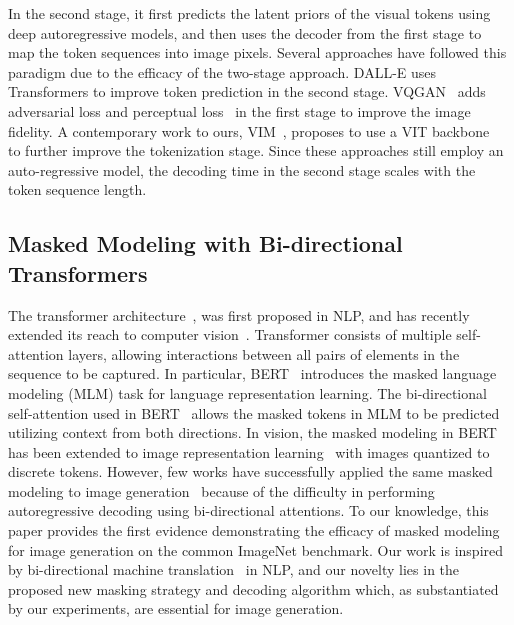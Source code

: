 \noindent In the second stage, it first predicts the latent priors of the visual tokens using deep autoregressive models, and then uses the decoder from the first stage to map the token sequences into image pixels. Several approaches have followed this paradigm due to the efficacy of the two-stage approach. DALL-E \cite{Ramesh21dalle} uses Transformers \cite{Vaswani17attention} to improve token prediction in the second stage. VQGAN~\cite{Esser21vqgan} adds adversarial loss and perceptual loss~\cite{johnson2016perceptual, zhang2018unreasonable} in the first stage to improve the image fidelity. A contemporary work to ours, VIM~\cite{vim2021}, proposes to use a VIT backbone ~\cite{dosovitskiy2021vit} to further improve the tokenization stage. Since these approaches still employ an auto-regressive model, the decoding time in the second stage scales with the token sequence length. 

\subsection{Masked Modeling with Bi-directional Transformers}
The transformer architecture~\cite{Vaswani17attention}, was first proposed in NLP, and has recently extended its reach to computer vision~\cite{dosovitskiy2021vit, caron2021dino}.
Transformer consists of multiple self-attention layers, allowing interactions between all pairs of elements in the sequence to be captured.
In particular, BERT~\cite{Devlin19bert} introduces the masked language modeling (MLM) task for language representation learning. The bi-directional self-attention used in BERT~\cite{Devlin19bert} allows the masked tokens in MLM to be predicted utilizing context from both directions.
In vision, the masked modeling in BERT~\cite{Devlin19bert} has been extended to image representation learning~\cite{he2021mae, Bao2022Beit} with images quantized to discrete tokens. However, few works have successfully applied the same masked modeling to image generation~\cite{zhang2021ufcbert} because of the difficulty in performing autoregressive decoding using bi-directional attentions.
To our knowledge, this paper provides the first evidence demonstrating the efficacy of masked modeling for image generation on the common ImageNet benchmark.
Our work is inspired by bi-directional machine translation~\cite{ghazvininejad2019maskpredict, gu2020fully, gu2017non} in NLP, and our novelty lies in the proposed new masking strategy and decoding algorithm which, as substantiated by our experiments, are essential for image generation.

